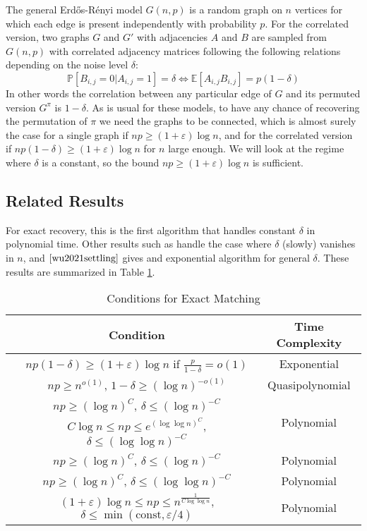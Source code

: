 \documentclass[11pt]{article}
\def\Pp{\mathbb P}
\def\E{\mathbb E}
\begin{document}
	The general Erd\H os-R\' enyi model $ G(n,p) $ is a random graph on $ n $ vertices for which each edge is present independently with probability $ p $. For the correlated version, two graphs $ G $ and $ G' $ with adjacencies $ A $ and $ B $ are sampled from $ G(n,p) $ with correlated adjacency matrices following the following relations depending on the noise level $ \delta $:
	\begin{equation*}
		\Pp[B_{i,j}=0|A_{i,j}=1] = \delta \iff \E[A_{i,j}B_{i,j}] = p(1-\delta)
	\end{equation*}
	In other words the correlation between any particular edge of $ G $ and its permuted version $ G^\pi $ is $ 1-\delta $. As is usual for these models, to have any chance of recovering the permutation of $ \pi $ we need the graphs to be connected, which is almost surely the case for a single graph if $ np\geq (1+\varepsilon)\log n $, and for the correlated version if $ np(1-\delta) \geq (1+\varepsilon)\log n $ for $ n $ large enough. We will look at the regime where $ \delta $ is a constant, so the bound $ np\geq (1+\varepsilon)\log n $ is sufficient.
	\subsection{Related Results}
	For exact recovery, this is the first algorithm that handles constant $ \delta $ in polynomial time. Other results such as \cite{DMWX18, FMWX19b, pmlr-v134-mrt} handle the case where $ \delta $ (slowly) vanishes in $ n $, and $ \cite{wu2021settling} $ gives and exponential algorithm for general $ \delta $. These results are summarized in Table \ref{tab:main-results}.
	\begin{table}[h]
		\caption{Conditions for Exact Matching}
		\centering
		\begin{tabular}{ | c | c | c | } 
			\hline
			& Condition & Time Complexity \\
			\hline
			\cite{wu2021settling} & $np (1-\delta) \ge (1+\varepsilon) \log n$ if $\frac{p}{1-\delta} = o(1)$ &  Exponential \\
			\hline
			\cite{barak2019nearly} & $np \ge n^{o(1)}$, $1 - \delta \ge (\log n)^{-o(1)}$ & Quasipolynomial \\ 
			\hline
			\multirow{2}{*}{\cite{DMWX18}} & $np \ge (\log n)^{C}$, $\delta \le (\log n)^{-C}$ & \multirow{2}{*}{Polynomial} \\ \cline{2-2}
			& $C \log n \le np \le e^{(\log \log n)^{C}}$, $\delta \le (\log \log n)^{-C}$ & \\ 
			\hline
			\cite{FMWX19b} & $np \ge (\log n)^{C}$, $\delta \le (\log n)^{-C}$ & Polynomial \\ 
			\hline
			\cite{pmlr-v134-mrt} & $np \ge (\log n)^{C}$, $\delta \le (\log \log n)^{-C}$ & Polynomial \\ 
			\hline
			\cite{mao2021exact} & $(1+\varepsilon) \log n \le np \le n^{\frac{1}{C \log \log n}}$, $\delta \le \min(\text{const}, \varepsilon/4)$ & Polynomial \\ 
			\hline
		\end{tabular}
		\label{tab:main-results}
	\end{table}
\end{document}
